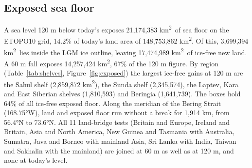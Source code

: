 \documentclass[11pt,a4paper]{article}
\newcommand{\kmq}{km\textsuperscript{2}}
\begin{document}
\subsection{Exposed sea floor}
A sea level 120 m below today's exposes 21,174,383 \kmq\ of sea floor on the ETOPO10 grid, 14.2\% of today's land area of 148,753,862 \kmq. Of this, 3,699,394 \kmq\ lies inside the LGM ice outline, leaving 17,474,989 \kmq\ of ice-free new land. A 60 m fall exposes 14,257,424 \kmq, 67\% of the 120 m figure. By region (Table~\ref{tab:shelves}, Figure~\ref{fig:exposed}) the largest ice-free gains at 120 m are the Sahul shelf (2,859,872 \kmq), the Sunda shelf (2,345,574), the Laptev, Kara and East Siberian shelves (1,810,593) and Beringia (1,641,739). The boxes hold 64\% of all ice-free exposed floor. Along the meridian of the Bering Strait (168.75°W), land and exposed floor run without a break for 1,914 km, from 56.4°N to 73.6°N. All 11 land-bridge tests (Britain and Europe, Ireland and Britain, Asia and North America, New Guinea and Tasmania with Australia, Sumatra, Java and Borneo with mainland Asia, Sri Lanka with India, Taiwan and Sakhalin with the mainland) are joined at 60 m as well as at 120 m, and none at today's level.
\end{document}
